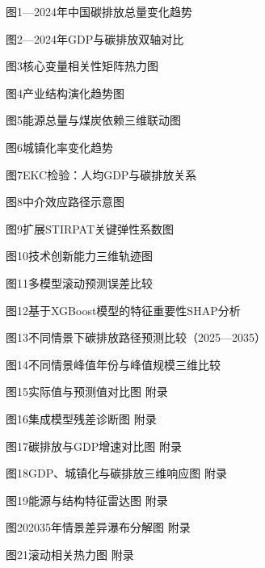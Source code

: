 \documentclass[12pt,a4paper]{ctexart}
\begin{document}
\vspace{1.2em}
\par
\vspace{0.5em}
\noindent 图1—2024年中国碳排放总量变化趋势 \dotfill \pageref{fig:co2_trend}\par
\noindent 图2—2024年GDP与碳排放双轴对比 \dotfill \pageref{fig:gdp_co2}\par
\noindent 图3\quad 核心变量相关性矩阵热力图 \dotfill \pageref{fig:corr}\par
\noindent 图4\quad 产业结构演化趋势图 \dotfill \pageref{fig:industry_structure}\par
\noindent 图5\quad 能源总量与煤炭依赖三维联动图 \dotfill \pageref{fig:energy_structure}\par
\noindent 图6\quad 城镇化率变化趋势 \dotfill \pageref{fig:urbanization_rate}\par
\noindent 图7\quad EKC检验：人均GDP与碳排放关系 \dotfill \pageref{fig:ekc}\par
\noindent 图8\quad 中介效应路径示意图 \dotfill \pageref{fig:mediation}\par
\noindent 图9\quad 扩展STIRPAT关键弹性系数图 \dotfill \pageref{fig:stirpat}\par
\noindent 图10\quad 技术创新能力三维轨迹图 \dotfill \pageref{fig:innovation_3d}\par
\noindent 图11\quad 多模型滚动预测误差比较 \dotfill \pageref{fig:model_perf}\par
\noindent 图12\quad 基于XGBoost模型的特征重要性SHAP分析 \dotfill \pageref{fig:shap}\par
\noindent 图13\quad 不同情景下碳排放路径预测比较（2025—2035） \dotfill \pageref{fig:scenario_paths}\par
\noindent 图14\quad 不同情景峰值年份与峰值规模三维比较 \dotfill \pageref{fig:peak_3d}\par
\noindent 图15\quad 实际值与预测值对比图 \dotfill 附录\par
\noindent 图16\quad 集成模型残差诊断图 \dotfill 附录\par
\noindent 图17\quad 碳排放与GDP增速对比图 \dotfill 附录\par
\noindent 图18\quad GDP、城镇化与碳排放三维响应图 \dotfill 附录\par
\noindent 图19\quad 能源与结构特征雷达图 \dotfill 附录\par
\noindent 图20\quad 2035年情景差异瀑布分解图 \dotfill 附录\par
\noindent 图21\quad 滚动相关热力图 \dotfill 附录\par
\clearpage
\end{document}
